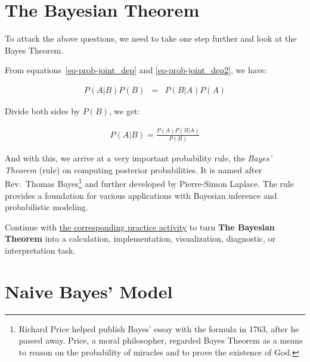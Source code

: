 \documentclass[
  letterpaper,
]{scrbook}
\begin{document}
\section{The Bayesian Theorem}\label{the-bayesian-theorem}

To attack the above questions, we need to take one step further and look
at the Bayes Theorem.

From equations~\hyperref[eq-prob-joint_dep]{{[}eq-prob-joint\_dep{]}}
and \hyperref[eq-prob-joint_dep2]{{[}eq-prob-joint\_dep2{]}}, we have:

\[\begin{aligned}
P(A|B) P(B)
& = & P(B|A) P(A)
\end{aligned}\]

Divide both sides by \(P(B)\), we get:

\[\begin{aligned}
P(A|B) = \frac{P(A) P(B|A)}{P(B)}
\end{aligned}\]

And with this, we arrive at a very important probability rule, the
\emph{Bayes' Theorem} (rule) on computing posterior probabilities. It is
named after Rev.~Thomas Bayes\footnote{Richard Price helped publish
  Bayes' essay with the formula in 1763, after he passed away. Price, a
  moral philosopher, regarded Bayes Theorem as a means to reason on the
  probability of miracles and to prove the existence of God.} and
further developed by Pierre-Simon Laplace. The rule provides a
foundation for various applications with Bayesian inference and
probabilistic modeling.

\begin{tcolorbox}[enhanced jigsaw, arc=.35mm, bottomrule=.15mm, bottomtitle=1mm, breakable, colback=white, colbacktitle=quarto-callout-tip-color!10!white, colframe=quarto-callout-tip-color-frame, coltitle=black, left=2mm, leftrule=.75mm, opacityback=0, opacitybacktitle=0.6, rightrule=.15mm, title=\textcolor{quarto-callout-tip-color}{\faLightbulb}\hspace{0.5em}{Put it into practice}, titlerule=0mm, toprule=.15mm, toptitle=1mm]

Continue with \hyperref[sec-pr-04-the-bayesian-theorem]{the
corresponding practice activity} to turn \textbf{The Bayesian Theorem}
into a calculation, implementation, visualization, diagnostic, or
interpretation task.

\end{tcolorbox}

\section{Naive Bayes' Model}\label{naive-bayes-model}
\end{document}
